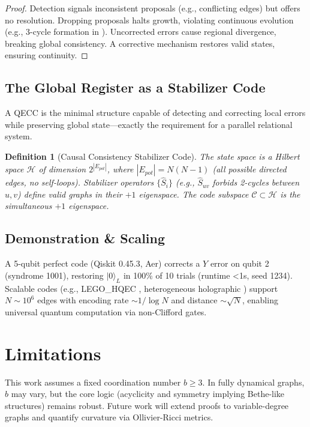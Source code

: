 \documentclass[11pt, a4paper]{article}
\newtheorem{definition}{Definition}[section]
\begin{document}
\begin{proof}
Detection signals inconsistent proposals (e.g., conflicting edges) but offers no resolution. Dropping proposals halts growth, violating continuous evolution (e.g., 3-cycle formation in \cite{fisher2025}). Uncorrected errors cause regional divergence, breaking global consistency. A corrective mechanism restores valid states, ensuring continuity.
\end{proof}

\subsection{The Global Register as a Stabilizer Code}
A QECC is the minimal structure capable of detecting and correcting local errors while preserving global state—exactly the requirement for a parallel relational system.

\begin{definition}[Causal Consistency Stabilizer Code]
\label{def:qecc}
The state space is a Hilbert space $\mathcal{H}$ of dimension $2^{|E_{pot}|}$, where $|E_{pot}| = N(N-1)$ (all possible directed edges, no self-loops). Stabilizer operators $\{\hat{S}_i\}$ (e.g., $\hat{S}_{uv}$ forbids 2-cycles between $u,v$) define valid graphs in their $+1$ eigenspace. The code subspace $\mathcal{C} \subset \mathcal{H}$ is the simultaneous $+1$ eigenspace.
\end{definition}

\subsection{Demonstration & Scaling}
A 5-qubit perfect code (Qiskit 0.45.3, Aer) corrects a $Y$ error on qubit 2 (syndrome 1001), restoring $|0\rangle_L$ in 100\% of 10 trials (runtime <1s, seed 1234). Scalable codes (e.g., LEGO_HQEC \cite{fan2024lego_hqec}, heterogeneous holographic \cite{steinberg2025hetero_holo}) support $N \sim 10^6$ edges with encoding rate $\sim 1/\log N$ and distance $\sim \sqrt{N}$, enabling universal quantum computation via non-Clifford gates.

\section{Limitations}
This work assumes a fixed coordination number $b \geq 3$. In fully dynamical graphs, $b$ may vary, but the core logic (acyclicity and symmetry implying Bethe-like structures) remains robust. Future work will extend proofs to variable-degree graphs and quantify curvature via Ollivier-Ricci metrics.
\end{document}
